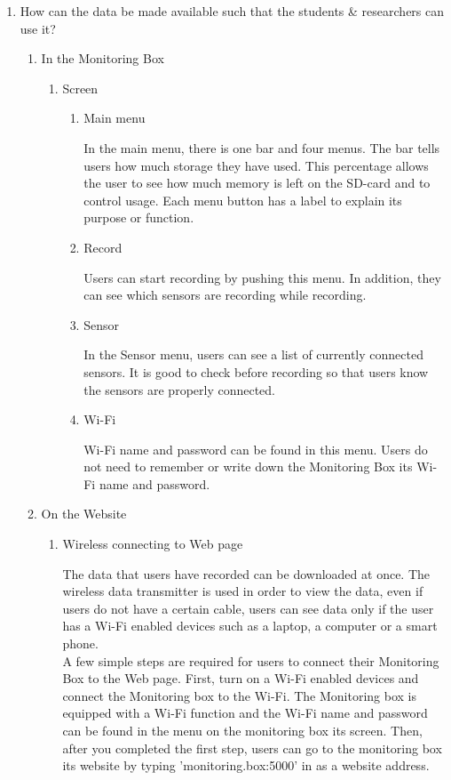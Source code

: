 \documentclass[conference]{IEEEtran}
\begin{document}
\begin{enumerate}
			\item How can the data be made available such that the students \& researchers can use it?
				\begin{enumerate}
					\item In the Monitoring Box
				\begin{enumerate}
			\item Screen
				\begin{enumerate}
					\item Main menu

						In the main menu, there is one bar and four menus. The bar tells users how much storage they have used. This percentage allows the user to see how much memory is left on the SD-card and to control usage. Each menu button has a label to explain its purpose or function.\\
					\item Record

						Users can start recording by pushing this menu. In addition, they can see which sensors are recording while recording.\\
					\item Sensor

						In the Sensor menu, users can see a list of currently connected sensors. It is good to check before recording so that users know the sensors are properly connected.\\
					\item Wi-Fi

						Wi-Fi name and password can be found in this menu. Users do not need to remember or write down the Monitoring Box its Wi-Fi name and password.\\
				\end{enumerate}
			\end{enumerate}
		\item On the Website
			\begin{enumerate}
				\item Wireless connecting to Web page

					The data that users have recorded can be downloaded at once. The wireless data transmitter is used in order to view the data, even if users do not have a certain cable, users can see data only if the user has a Wi-Fi enabled devices such as a laptop, a computer or a smart phone. \\
					A few simple steps are required for users to connect their Monitoring Box to the Web page. First, turn on a Wi-Fi enabled devices and connect the Monitoring box to the Wi-Fi. The Monitoring box is equipped with a Wi-Fi function and the Wi-Fi name and password can be found in the menu on the monitoring box its screen. Then, after you completed the first step, users can go to the monitoring box its website by typing 'monitoring.box:5000' in as a website address.\\


\end{enumerate}
\end{enumerate}
\end{enumerate}
\end{document}
